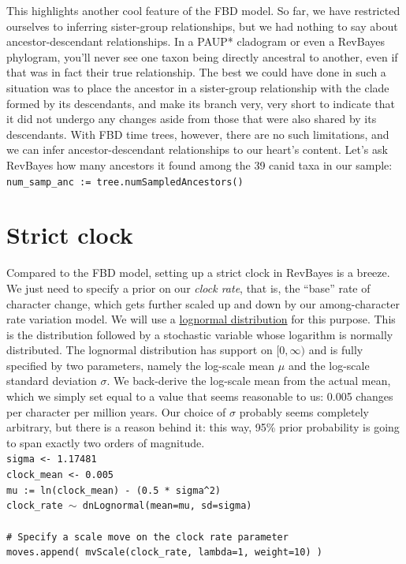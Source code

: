 \documentclass[12pt]{article}
\begin{document}
\noindent This highlights another cool feature of the FBD model. So far, we have restricted ourselves to inferring sister-group relationships, but we had nothing to say about ancestor-descendant relationships. In a PAUP* cladogram or even a RevBayes phylogram, you'll never see one taxon being directly ancestral to another, even if that was in fact their true relationship. The best we could have done in such a situation was to place the ancestor in a sister-group relationship with the clade formed by its descendants, and make its branch very, very short to indicate that it did not undergo any changes aside from those that were also shared by its descendants. With FBD time trees, however, there are no such limitations, and we can infer ancestor-descendant relationships to our heart's content. Let's ask RevBayes how many ancestors it found among the 39 canid taxa in our sample: \\

\indent \texttt{num\_samp\_anc := tree.numSampledAncestors()}

\section*{Strict clock}

Compared to the FBD model, setting up a strict clock in RevBayes is a breeze. We just need to specify a prior on our \textit{clock rate}, that is, the ``base'' rate of character change, which gets further scaled up and down by our among-character rate variation model. We will use a \href{https://en.wikipedia.org/wiki/Log-normal_distribution}{lognormal distribution} for this purpose. This is the distribution followed by a stochastic variable whose logarithm is normally distributed. The lognormal distribution has support on $[0, \infty)$ and is fully specified by two parameters, namely the log-scale mean $\mu$ and the log-scale standard deviation $\sigma$. We back-derive the log-scale mean from the actual mean, which we simply set equal to a value that seems reasonable to us: 0.005 changes per character per million years. Our choice of $\sigma$ probably seems completely arbitrary, but there is a reason behind it: this way, 95\% prior probability is going to span exactly two orders of magnitude. \\

\indent \texttt{sigma <- 1.17481} \\
\indent \texttt{clock\_mean <- 0.005} \\
\indent \texttt{mu := ln(clock\_mean) - (0.5 * sigma\textasciicircum 2)} \\
\indent \texttt{clock\_rate {\footnotesize $\sim$} dnLognormal(mean=mu, sd=sigma)} \\
\ \\
\indent \texttt{\# Specify a scale move on the clock rate parameter} \\
\indent \texttt{moves.append( mvScale(clock\_rate, lambda=1, weight=10) )} \\
\end{document}
